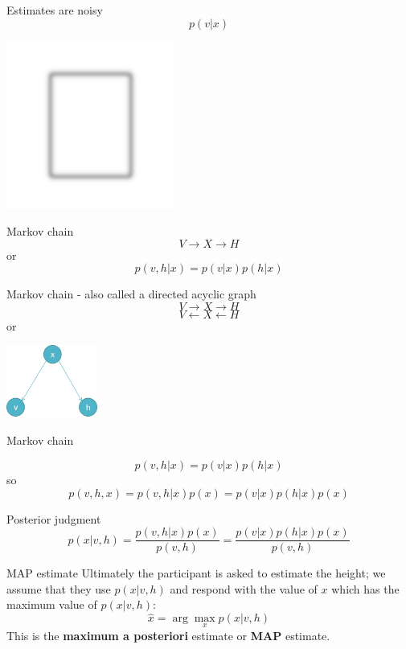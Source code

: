 \documentclass{beamer}
\newcommand{\crish}{\color{reddish}}
\newcommand{\cbla}{\color{black}}
\begin{document}
\begin{frame}{Estimates are noisy}
\crish$$p(v|x)$$\cbla{} 
  \begin{center}
\includegraphics[width=5.5cm]{blurred_box.png}
\end{center}
\end{frame}

\begin{frame}{Markov chain}
\crish$$
V\rightarrow X\rightarrow H
$$\cbla{}
or
\crish$$
p(v,h|x)=p(v|x)p(h|x)
$$\cbla{}
\end{frame}


\begin{frame}{Markov chain - also called a directed acyclic graph}
\crish$$
V\rightarrow X\rightarrow H
$$\cbla{}
\crish$$
V\leftarrow X\leftarrow H
$$\cbla{}
or
\begin{center}
  \includegraphics[width=3cm]{fig_dag.png}
\end{center}
\end{frame}


\begin{frame}{Markov chain}

\crish$$
p(v,h|x)=p(v|x)p(h|x)
$$\cbla{}
so
\crish$$
p(v,h,x)=p(v,h|x)p(x)=p(v|x)p(h|x)p(x)
$$\cbla{}
\end{frame}

\begin{frame}{Posterior judgment}
  \crish$$
  p(x|v,h)=\frac{p(v,h|x)p(x)}{p(v,h)}=\frac{p(v|x)p(h|x)p(x)}{p(v,h)}
  $$\cbla{}
\end{frame}

\begin{frame}{MAP estimate}
  Ultimately the participant is asked to estimate the height; we
  assume that they use \crish$p(x|v,h)$\cbla{} and respond with the
  value of \crish$x$\cbla{} which has the maximum value of
  \crish$p(x|v,h)$\cbla{}:
  \crish$$
  \hat{x}=\arg\max_x{p(x|v,h)}
  $$\cbla{}
  This is the \textbf{maximum a posteriori} estimate or \textbf{MAP} estimate.
\end{frame}
\end{document}
